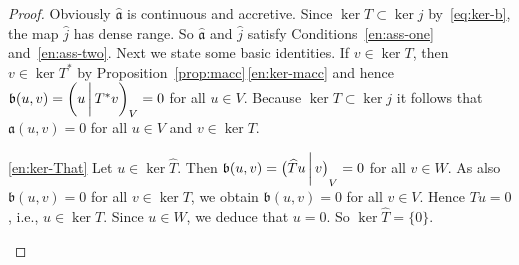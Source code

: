 \documentclass[a4paper,oneside,12pt]{amsart}
\theoremstyle{plain}
\theoremstyle{definition}
\begin{document}
\begin{proof}
Obviously ${{\mathfrak{{\hat{a}}}}}$ is continuous and accretive. Since $\ker T\subset\ker j$ by~\eqref{eq:ker-b}, the map $\hat{j}$ has dense range.
So ${{\mathfrak{{\hat{a}}}}}$ and $\hat{j}$ satisfy Conditions~\ref{en:ass-one} and~\ref{en:ass-two}. 
Next we state some basic identities.
If $v\in\ker T$, then $v\in\ker T^*$ by Proposition~\ref{prop:macc}\,\ref{en:ker-macc} and hence ${{\mathfrak{{b}}}}(u,v)={{\ifthenelse{\equal{auto}{auto}}{\left({u}\mkern3mu{\biggm|}\mkern3mu {T^*v}\right)}{}
\ifthenelse{\equal{auto}{b}}{\bigl({u}\mkern3mu{\biggm|}\mkern3mu {T^*v}\bigr)}{}
\ifthenelse{\equal{auto}{B}}{\Bigl({u}\mkern3mu{\bigm|}\mkern3mu {T^*v}\Bigr)}{}
}}_V=0$ for all $u\in V$.
Because $\ker T\subset\ker j$ it follows that ${{\mathfrak{{a}}}}(u,v)=0$ for all $u\in V$ and $v\in\ker T$.

\begin{asparaenum}
\item[\ref{en:ker-That}]
Let $u\in\ker\widehat{T}$. Then ${{\mathfrak{{b}}}}(u,v)={{\ifthenelse{\equal{b}{auto}}{\left({\widehat{T}u}\mkern3mu{\biggm|}\mkern3mu {v}\right)}{}
\ifthenelse{\equal{b}{b}}{\bigl({\widehat{T}u}\mkern3mu{\biggm|}\mkern3mu {v}\bigr)}{}
\ifthenelse{\equal{b}{B}}{\Bigl({\widehat{T}u}\mkern3mu{\bigm|}\mkern3mu {v}\Bigr)}{}
}}_V=0$ for all $v\in W$. As also ${{\mathfrak{{b}}}}(u,v)=0$ for all $v\in\ker T$,
we obtain ${{\mathfrak{{b}}}}(u,v)=0$ for all $v\in V$. Hence $Tu=0$, i.e., $u\in\ker T$. Since $u\in W$, we deduce that $u=0$. So $\ker\widehat{T}=\{0\}$.


\end{asparaenum}
\end{proof}
\end{document}
